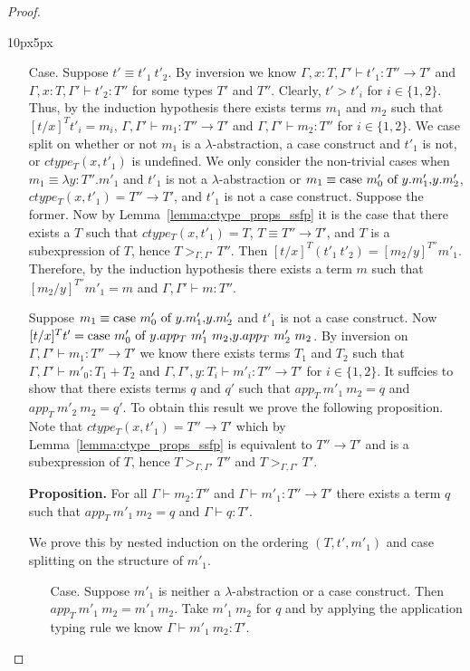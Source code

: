\begin{proof}
\begin{changemargin}{10px}{5px}
\begin{itemize}
\item[Case.] Suppose $t' \equiv t'_1\ t'_2$.  By inversion we know
  $\Gamma, x:T, \Gamma' \vdash t'_1 : T'' \to T'$ and
  $\Gamma, x:T, \Gamma' \vdash t'_2 : T''$ for some types $T'$ and $T''$.
  Clearly, $t' > t'_i$ for $i \in \{1,2\}$.  Thus, by the induction hypothesis
  there exists terms $m_1$ and $m_2$ such that $[t/x]^T t'_i = m_i$,
  $\Gamma, \Gamma' \vdash m_1 : T'' \to T'$ and
  $\Gamma, \Gamma' \vdash m_2 : T''$ for
  $i \in \{1,2\}$.  We case split on whether or not $m_1$ is a $\lambda$-abstraction,
  a case construct and $t'_1$ is not, or $ctype_T(x,t'_1)$ is undefined.  
  We only consider the non-trivial cases when 
  $m_1 \equiv \lambda y:T''.m'_1$ and $t'_1$ is not a $\lambda$-abstraction or $m_1 \equiv \mbox{case}\ m'_0\ \text{of}\ y\text{.}m'_1\text{,}y\text{.}m'_2$,
  $ctype_T(x,t'_1) = T'' \to T'$, and $t'_1$ is not a case construct.  Suppose the former.  
  Now by Lemma~\ref{lemma:ctype_props_ssfp} it is the case that 
  there exists a $T$ such that $ctype_T(x,t'_1) = T$, 
  $T \equiv T'' \to T'$, and $T$ is a subexpression of $T$, hence
  $T >_{\Gamma,\Gamma'} T''$.
  Then $[t/x]^T (t'_1\ t'_2) = [m_2/y]^{T''} m'_1$.  
  Therefore, by the induction hypothesis there exists a 
  term $m$ such that $[m_2/y]^{T''} m'_1 = m$ and $\Gamma,\Gamma' \vdash m:T''$.
   
  Suppose $m_1 \equiv \mbox{case}\ m'_0\ \text{of}\ y\text{.}m'_1\text{,}y\text{.}m'_2$ and $t'_1$ is not a case construct.
  Now $[t/x]^T t' = \mbox{case}\ m'_0\ \text{of}\ y\text{.}app_T\ m'_1\ m_2\text{,}y\text{.}app_T\ m'_2\ m_2$.  By inversion on
  $\Gamma,\Gamma' \vdash m_1 : T'' \to T'$ we know there exists terms $T_1$ and $T_2$ such that
  $\Gamma,\Gamma' \vdash m'_0:T_1+T_2$ and
  $\Gamma,\Gamma',y:T_i \vdash m'_i:T'' \to T'$
  for $i \in \{1,2\}$.  It suffcies to show that
  there exists terms $q$ and $q'$ such that $app_T\ m'_1\ m_2 = q$ and $app_T\ m'_2\ m_2 = q'$.  To obtain
  this result we prove the following proposition.  Note that $ctype_T(x,t'_1) = T'' \to T'$ which
  by Lemma~\ref{lemma:ctype_props_ssfp} is equivalent to $T'' \to T'$ and is 
  a subexpression of $T$, hence $T >_{\Gamma,\Gamma'} T''$ and $T >_{\Gamma,\Gamma'} T'$.
 
  {\bf Proposition.}  For all 
  $\Gamma \vdash m_2 : T''$ and $\Gamma \vdash m'_1:T'' \to T'$
  there exists a term $q$ such that $app_T\ m'_1\ m_2 = q$ and $\Gamma \vdash q:T'$.
  
  We prove this by nested induction on the ordering $(T, t', m'_1)$ and case splitting on 
  the structure of $m'_1$.
  \begin{itemize}
  \item[Case.] Suppose $m'_1$ is neither a $\lambda$-abstraction or a case construct.  Then\\
    $app_T\  m'_1\ m_2 = m'_1\ m_2$.  Take $m'_1\ m_2$ for $q$ and by applying the application typing rule
    we know $\Gamma \vdash m'_1\ m_2:T'$.
    

\end{itemize}
\end{itemize}
\end{changemargin}
\end{proof}
